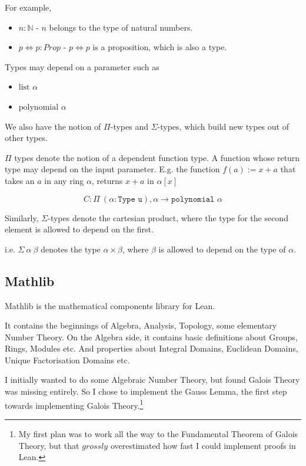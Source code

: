 \documentclass[pagesize=a4]{scrreprt}
\newcommand{\N}{\mathbb{N}}
\begin{document}
For example, 

\begin{itemize}
    \item $n : \N$ - $n$ belongs to the type of natural numbers. 
    \item $p \iff  p : Prop$ - $p \iff p$ is a proposition, which is also a type. 
\end{itemize}

Types may depend on a parameter such as 

\begin{itemize}
  \item $\text{list } \alpha$
  \item $\text{polynomial } \alpha$
\end{itemize}

We also have the notion of $\Pi$-types and $\Sigma$-types, which build new types out of other types. 

$\Pi$ types denote the notion of a dependent function type. A function whose return type may depend on the input parameter. E.g. the function $f(a) := x + a$ that takes an $a$ in any ring $\alpha$, returns $x + a$ in $\alpha[x]$

$$C :\Pi\ (\alpha : \texttt{Type u}), \alpha \rightarrow \texttt{polynomial } \alpha $$

Similarly, $\Sigma$-types denote the cartesian product, where the type for the second element is allowed to depend on the first. 

i.e. $\Sigma\ \alpha\ \beta$ denotes the type $\alpha \times \beta$, where $\beta$ is allowed to depend on the type of $ \alpha$. 

\subsection{Mathlib}

Mathlib is the mathematical components library for Lean. 

It contains the beginnings of Algebra, Analysis, Topology, some elementary Number Theory. On the Algebra side, it contains basic definitions about Groups, Rings, Modules etc. And properties about Integral Domains, Euclidean Domains, Unique Factorisation Domains etc. 

I initially wanted to do some Algebraic Number Theory, but found Galois Theory was missing entirely. So I chose to implement the Gauss Lemma, the first step towards implementing Galois Theory.\footnote{My first plan was to work all the way to the Fundamental Theorem of Galois Theory, but that $grossly$ overestimated how fast I could implement proofs in Lean.} 
\end{document}
